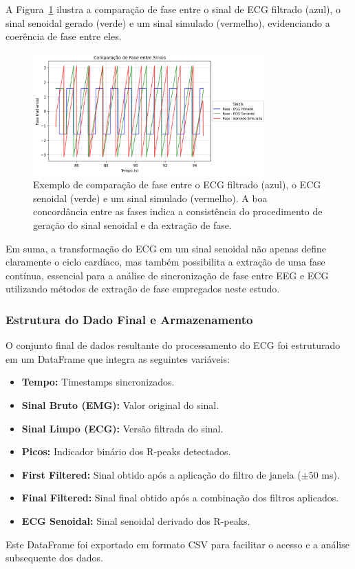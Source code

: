A Figura~\ref{fig:ecg_comparacao_fase} ilustra a comparação de fase entre o sinal de ECG filtrado (azul), o sinal senoidal gerado (verde) e um sinal simulado (vermelho), evidenciando a coerência de fase entre eles.

\begin{figure}[htb]
    \centering
    \includegraphics[width=0.8\textwidth]{figs/2_preprocessamento_ecg/3_Comparação_de_Fase_entre_Sinais.png}
    \caption{Exemplo de comparação de fase entre o ECG filtrado (azul), o ECG senoidal (verde) e um sinal simulado (vermelho). A boa concordância entre as fases indica a consistência do procedimento de geração do sinal senoidal e da extração de fase.}
    \label{fig:ecg_comparacao_fase}
\end{figure}

Em suma, a transformação do ECG em um sinal senoidal não apenas define claramente o ciclo cardíaco, mas também possibilita a extração de uma fase contínua, essencial para a análise de sincronização de fase entre EEG e ECG utilizando métodos de extração de fase empregados neste estudo.

\subsubsection{Estrutura do Dado Final e Armazenamento}

O conjunto final de dados resultante do processamento do ECG foi estruturado em um DataFrame que integra as seguintes variáveis:
\begin{itemize}
    \item \textbf{Tempo:} Timestamps sincronizados.
    \item \textbf{Sinal Bruto (EMG):} Valor original do sinal.
    \item \textbf{Sinal Limpo (ECG):} Versão filtrada do sinal.
    \item \textbf{Picos:} Indicador binário dos R-peaks detectados.
    \item \textbf{First Filtered:} Sinal obtido após a aplicação do filtro de janela (\(\pm50\) ms).
    \item \textbf{Final Filtered:} Sinal final obtido após a combinação dos filtros aplicados.
    \item \textbf{ECG Senoidal:} Sinal senoidal derivado dos R-peaks.
\end{itemize}

Este DataFrame foi exportado em formato CSV para facilitar o acesso e a análise subsequente dos dados.
